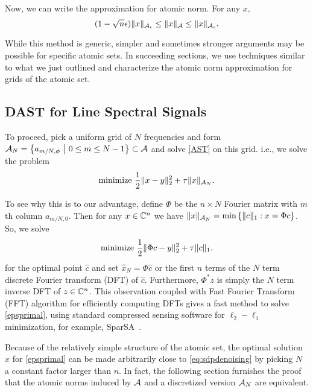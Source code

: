 Now, we can write the approximation for atomic norm. For any $x,$
\begin{equation}
\label{eq:enet-approx}	
(1-\sqrt{n}\epsilon)\lVert x\rVert_{\mathcal{A}_\epsilon} \leq \lVert x\rVert_{\mathcal{A}} \leq \lVert x\rVert_{\mathcal{A}_\epsilon}.
\end{equation}

While this method is generic, simpler and sometimes stronger arguments may be possible for specific atomic sets. In succeeding sections, we use techniques similar to what we just outlined and characterize the atomic norm approximation for grids of the atomic set.


\subsection{DAST for Line Spectral Signals}\label{sec:comp-method}

To proceed, pick a uniform grid of $N$ frequencies and form $\mathcal{A}_N = \left\{
a_{m/N,\phi} ~\middle|~ 0 \leq m \leq N-1 \right\} \subset \mathcal{A} $ and solve
\eqref{AST} on this grid. i.e., we solve the problem
\begin{equation}
	\label{epsprimal} \text{minimize }\frac{1}{2} \lVert x - y\rVert_2^2 + \tau \lVert x\rVert_{\mathcal{A}_N}. 
\end{equation}

To see why this is to our advantage, define $\Phi$ be the $n \times N$ Fourier
matrix with $m$th column $a_{m/N,0}$. Then for any $x \in \mathbb{C}^n$ we have $\lVert x\rVert_{\mathcal{A}_N} = \min\left\{ \lVert c\rVert_1: x = \Phi c \right\}$.
So, we solve
\begin{equation}
	\label{sparsa} \text{minimize }\frac{1}{2} \lVert\Phi c- y\rVert_2^2 + \tau \lVert c\rVert_1. 
\end{equation}
for the optimal point $\hat{c}$ and set $\hat{x}_N = \Phi \hat{c}$ or the first
$n$ terms of the $N$ term discrete Fourier transform (DFT) of $\hat{c}$.
Furthermore, $\Phi^* z$ is simply the $N$ term inverse DFT of $z \in \mathbb{C}^n$.
This observation coupled with Fast Fourier Transform (FFT) algorithm for
efficiently computing DFTs gives a fast method to solve \eqref{epsprimal},
using standard compressed sensing software for $\ell_2-\ell_1$ minimization,
for example, SparSA~\cite{wright09}.

Because of the relatively simple structure of the atomic set, the optimal
solution $\hat{x}$ for \eqref{epsprimal} can be made arbitrarily close to
\eqref{eq:sdpdenoising} by picking $N$ a constant factor larger than $n$. In
fact, the following section furnishes the proof that the atomic norms induced by $\mathcal{A}$ and a discretized version $\mathcal{A}_N$ are equivalent.

